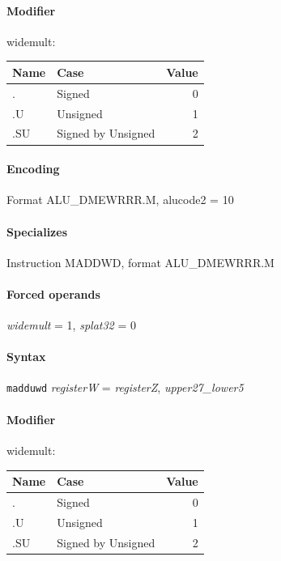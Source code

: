 {\paragraph{Modifier} \textsf{widemult}:\\

\noindent \begin{tabular}{|l|l|r|} \hline
\bf{Name} & \bf{Case} & \bf{Value} \\ \hline
. & Signed & 0 \\
.U & Unsigned & 1 \\
.SU & Signed by Unsigned & 2 \\
\hline \end{tabular}

\paragraph{Encoding} Format \textsf{ALU\_DMEWRRR.M, alucode2 = 10}\\



\paragraph{Specializes} Instruction MADDWD, format ALU\_DMEWRRR.M

\paragraph{Forced operands} \emph{widemult} = 1, \emph{splat32} = 0

\paragraph{Syntax} \texttt{madduwd} \emph{registerW} = \emph{registerZ}, \emph{upper27\_lower5}

\paragraph{Modifier} \textsf{widemult}:\\

\noindent \begin{tabular}{|l|l|r|} \hline
\bf{Name} & \bf{Case} & \bf{Value} \\ \hline
. & Signed & 0 \\
.U & Unsigned & 1 \\
.SU & Signed by Unsigned & 2 \\
\hline \end{tabular}

}

